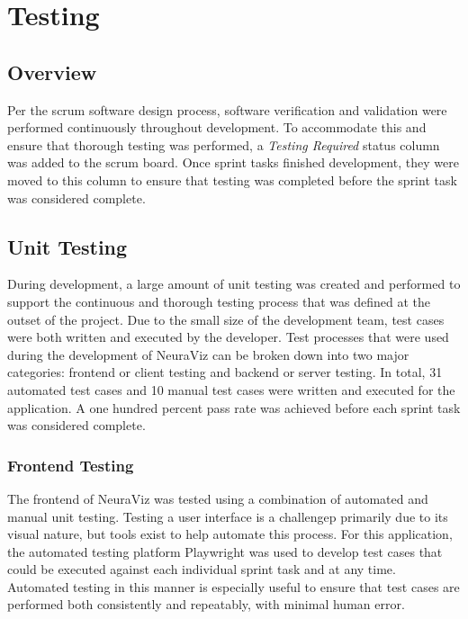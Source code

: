 \section{Testing}
\label{sec:Testing}

\subsection{Overview} 
Per the scrum software design process, software verification and validation were performed continuously throughout development. To accommodate this and ensure that thorough testing was performed, a \textit{Testing Required} status column was added to the scrum board. Once sprint tasks finished development, they were moved to this column to ensure that testing was completed before the sprint task was considered complete.

\subsection{Unit Testing}
During development, a large amount of unit testing was created and performed to support the continuous and thorough testing process that was defined at the outset of the project. Due to the small size of the development team, test cases were both written and executed by the developer. Test processes that were used during the development of NeuraViz can be broken down into two major categories: frontend or client testing and backend or server testing. In total, 31 automated test cases and 10 manual test cases were written and executed for the application. A one hundred percent pass rate was achieved before each sprint task was considered complete.

\subsubsection{Frontend Testing}
The frontend of NeuraViz was tested using a combination of automated and manual unit testing. Testing a user interface is a challengep primarily due to its visual nature, but tools exist to help automate this process. For this application, the automated testing platform Playwright \cite{playwright} was used to develop test cases that could be executed against each individual sprint task and at any time. Automated testing in this manner is especially useful to ensure that test cases are performed both consistently and repeatably, with minimal human error. 

